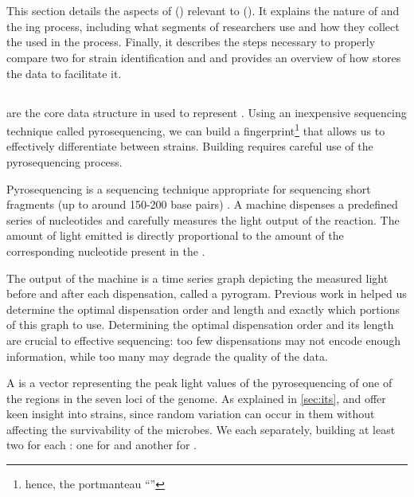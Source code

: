 \section{\cploplong{}}\label{sec:background:cplop}

This section details the aspects of \cploplong{} (\cplop{}) relevant to \mstlong{} (\mst{}).
It explains the nature of \pyros{} and the \pyro{}ing process, including what segments of \ecoli{} \dna{} \cplop{} researchers use and how they collect the \isols{} used in the process.
Finally, it describes the steps necessary to properly compare two \ecoli{} \isols{} for strain identification and \mst{} and provides an overview of how \cplop{} stores the \pyro{} data to facilitate it.

\subsection{\Pyros{}}\label{sec:pyroprints}
\Pyros{} are the core data structure in \cplop{} used to represent \ecoli{} \isols{}.
\index{\pyro{}}
Using an inexpensive \dna{} sequencing technique called pyrosequencing, we can build a fingerprint\footnote{hence, the portmanteau ``\pyro{}''} that allows us to effectively differentiate between \ecoli{} strains.
Building \pyros{} requires careful use of the pyrosequencing process.

Pyrosequencing is a \dna{} sequencing technique appropriate for sequencing short \dna{} fragments (up to around 150-200 base pairs) \cite{ronaghi1998sequencing}.
A machine dispenses a predefined series of nucleotides and carefully measures the light output of the reaction.
The amount of light emitted is directly proportional to the amount of the corresponding nucleotide present in the \dna{}.

The output of the machine is a time series graph depicting the measured light before and after each dispensation, called a pyrogram.
Previous work in \cite{montana2013algorithms, Shealy:SeniorProject} helped us determine the optimal dispensation order and length and exactly which portions of this graph to use.
Determining the optimal dispensation order and its length are crucial to effective sequencing: too few dispensations may not encode enough information, while too many may degrade the quality of the data.

A \textit{\pyro{}} is a vector representing the peak light values of the pyrosequencing of one of the \itsshort{} regions in the seven loci of the \ecoli{} genome.
\index{\pyro{}}
As explained in \autoref{sec:its}, \Ssixt{} and \Sfive{} offer keen insight into \ecoli{} strains, since random variation can occur in them without affecting the survivability of the \ecoli{} microbes.
We \pyro{} each \itsshort{} separately, building at least two \pyros{} for each \isol{}: one for \Ssixt{} and another for \Sfive{}.


